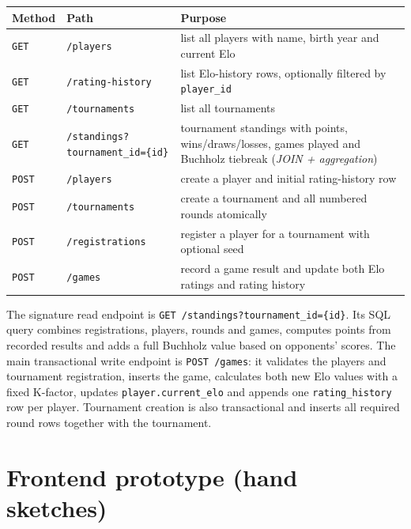 \documentclass[11pt,a4paper]{article}
\begin{document}
\renewcommand{\arraystretch}{1.2}
\begin{tabularx}{\linewidth}{@{}p{1.6cm}p{4.6cm}X@{}}
\toprule
\textbf{Method} & \textbf{Path} & \textbf{Purpose} \\
\midrule
\texttt{GET}  & \texttt{/players}                              & list all players with name, birth year and current Elo \\
\texttt{GET}  & \texttt{/rating-history}                       & list Elo-history rows, optionally filtered by \texttt{player\_id} \\
\texttt{GET}  & \texttt{/tournaments}                          & list all tournaments \\
\texttt{GET}  & \texttt{/standings?tournament\_id=\{id\}}      & tournament standings with points, wins/draws/losses, games played and Buchholz tiebreak (\emph{JOIN + aggregation}) \\
\texttt{POST} & \texttt{/players}                              & create a player and initial rating-history row \\
\texttt{POST} & \texttt{/tournaments}                          & create a tournament and all numbered rounds atomically \\
\texttt{POST} & \texttt{/registrations}                        & register a player for a tournament with optional seed \\
\texttt{POST} & \texttt{/games}                                & record a game result and update both Elo ratings and rating history \\
\bottomrule
\end{tabularx}

The signature read endpoint is \texttt{GET /standings?tournament\_id=\{id\}}.
Its SQL query combines registrations, players, rounds and games, computes points
from recorded results and adds a full Buchholz value based on opponents' scores.
The main transactional write endpoint is \texttt{POST /games}: it validates the
players and tournament registration, inserts the game, calculates both new Elo
values with a fixed K-factor, updates \texttt{player.current\_elo} and appends
one \texttt{rating\_history} row per player. Tournament creation is also
transactional and inserts all required round rows together with the tournament.

\section{Frontend prototype (hand sketches)}
\end{document}
